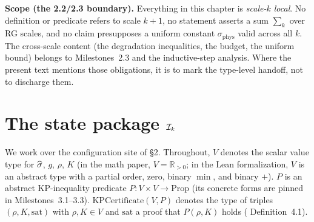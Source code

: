 \textbf{Scope (the 2.2/2.3 boundary).}  Everything in this chapter is \emph{scale-$k$ local}.  No definition or predicate refers to scale $k+1$, no statement asserts a sum $\sum_k$ over RG scales, and no claim presupposes a uniform constant $\sigma_{\mathrm{phys}}$ valid across all $k$.  The cross-scale content (the degradation inequalities, the budget, the uniform bound) belongs to Milestones~2.3 and the inductive-step analysis.  Where the present text mentions those obligations, it is to mark the type-level handoff, not to discharge them.

\section{The state package $\mathcal{I}_k$}
\label{sec:state}

We work over the configuration site of  \S2.  Throughout, $V$ denotes the scalar value type for $\widehat{\sigma}$, $g$, $\rho$, $K$ (in the math paper, $V = \mathbb{R}_{>0}$; in the Lean formalization, $V$ is an abstract type with a partial order, zero, binary $\min$, and binary $+$).  $P$ is an abstract KP-inequality predicate $P \colon V \times V \to \mathrm{Prop}$ (its concrete forms are pinned in Milestones~3.1--3.3).  $\mathrm{KPCertificate}(V, P)$ denotes the type of triples $(\rho, K, \mathrm{sat})$ with $\rho, K \in V$ and $\mathrm{sat}$ a proof that $P(\rho, K)$ holds ( Definition~4.1).

